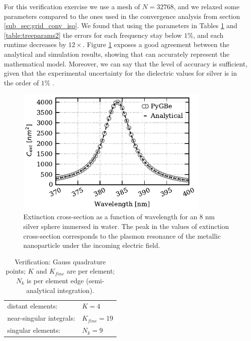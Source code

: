 For this verification exercise we use a mesh of $N=32768$, and we relaxed some parameters 
compared to the ones used in the convergence analysis from section \ref{sub_sec:grid_conv_iso}. We found 
that using the parameters in Tables \ref{table:quadparams2} and \ref{table:treeparams2} the errors for each 
frequency stay below $1\%$, and each runtime decreases by $12\times$. Figure \ref{fig:verif_sph} exposes a good 
agreement between the analytical and simulation results, showing that \pygbe can accurately represent the 
mathematical model. Moreover, we can say that the level of accuracy is sufficient, given that the experimental 
uncertainty for the dielectric values for silver is in the order of $1\%$ \cite{JohnsonChristy1972}. 

\begin{figure}%
    \centering
    \includegraphics[width=0.85\textwidth]{silver_NP_verification.pdf} 
    \caption{Extinction cross-section as a function of wavelength for an $8$ nm
             silver sphere immersed in water. The peak in the values of 
             extinction cross-section corresponds to the plasmon resonance of the metallic 
             nanoparticle under the incoming electric field.}
    \label{fig:verif_sph}
 \end{figure}

\begin{table}%
    \centering
    \caption{\label{table:quadparams2} Verification: Gauss quadrature points; 
    $K$ and $K_{fine}$ are per element; $N_k $ is per element edge (semi-analytical integration). } 
    \begin{tabular}{l l}
    \hline%
     distant elements: & $K=4$ \\
     near-singular integrals:   & $ K_{fine}=19$ \\
     singular elements:  & $N_k =9$ \\
    \hline%
    \end{tabular}
\end{table}


